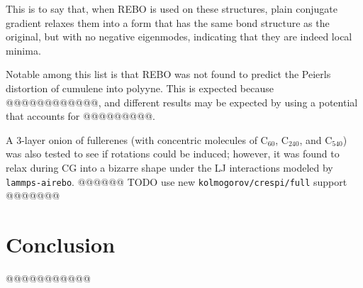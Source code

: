 \documentclass[11pt]{article}
\theoremstyle{definition}
\theoremstyle{remark}
\newcommand{\chem}[1]{\ensuremath{\mathrm{#1}}}
\begin{document}
This is to say that, when REBO is used on these structures, plain conjugate gradient relaxes them into a form that has the same bond structure as the original, but with no negative eigenmodes, indicating that they are indeed local minima.

Notable among this list is that REBO was not found to predict the Peierls distortion of cumulene into polyyne.  This is expected because @@@@@@@@@@@@, and different results may be expected by using a potential that accounts for @@@@@@@@@.

A 3-layer onion of fullerenes (with concentric molecules of $\chem{C_{60}}$, $\chem{C_{240}}$, and $\chem{C_{540}}$) was also tested to see if rotations could be induced; however, it was found to relax during CG into a bizarre shape under the LJ interactions modeled by \verb|lammps-airebo|. @@@@@@ TODO use new \verb|kolmogorov/crespi/full| support @@@@@@@

\section{Conclusion}

@@@@@@@@@@@

\printbibliography
\end{document}
